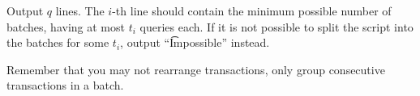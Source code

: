 Output $q$ lines. The $i$-th line should contain the minimum possible number of batches, having at most $t_i$ queries each. If it is not possible to split the script into the batches for some $t_i$, output ``\t{Impossible}'' instead.

Remember that you may not rearrange transactions, only group consecutive transactions in a batch.
